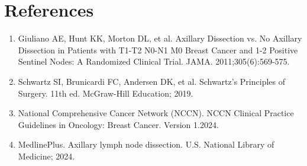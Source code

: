 \section*{References}
\begin{enumerate}
  \item Giuliano AE, Hunt KK, Morton DL, et al. Axillary Dissection vs. No Axillary Dissection in Patients with T1-T2 N0-N1 M0 Breast Cancer and 1-2 Positive Sentinel Nodes: A Randomized Clinical Trial. JAMA. 2011;305(6):569-575.
  \item Schwartz SI, Brunicardi FC, Andersen DK, et al. Schwartz's Principles of Surgery. 11th ed. McGraw-Hill Education; 2019.
  \item National Comprehensive Cancer Network (NCCN). NCCN Clinical Practice Guidelines in Oncology: Breast Cancer. Version 1.2024.
  \item MedlinePlus. Axillary lymph node dissection. U.S. National Library of Medicine; 2024.
\end{enumerate}

\clearpage
